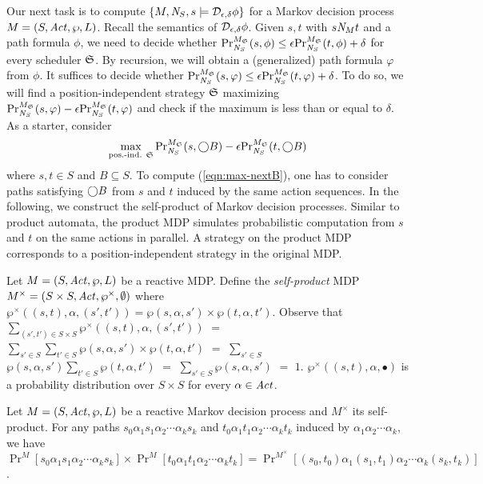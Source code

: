 Our next task is to compute $\{ M, \neighbor{S}, s \models
\dpriv{\epsilon}{\delta} \phi \}$ for a Markov decision process $M =
(S, \Act, \wp, L)$. Recall the semantics of $\dpriv{\epsilon}{\delta}
\phi$. Given $s, t$ with $s \neighbor{M} t$ and a path formula
$\phi$, we need to decide whether
$\myPr{s}{M_{\scheduler{S}}}{\neighbor{S}}{\phi} \leq 
\epsilon \myPr{t}{M_{\scheduler{S}}}{\neighbor{S}}{\phi} + \delta$
for every scheduler $\scheduler{S}$. 
By recursion, we will obtain a
(generalized) path formula $\varphi$ from $\phi$. It suffices to
decide whether 
$\myPr{s}{M_{\scheduler{S}}}{\neighbor{S}}{\varphi} \leq 
\epsilon \myPr{t}{M_{\scheduler{S}}}{\neighbor{S}}{\varphi} + \delta$.
To do so, we will find a position-independent strategy $\scheduler{S}$
maximizing $\myPr{s}{M_{\scheduler{S}}}{\neighbor{S}}{\varphi} -
\epsilon \myPr{t}{M_{\scheduler{S}}}{\neighbor{S}}{\varphi}$ and check
if the maximum is less than or equal to $\delta$. 
As a starter, consider
\begin{eqnarray}
  \label{eqn:max-nextB}
\max_{\textmd{pos.-ind. } \scheduler{S}} 
\myPr{s}{M_{\scheduler{S}}}{\neighbor{S}}{\gX B} -
\epsilon \myPr{t}{M_{\scheduler{S}}}{\neighbor{S}}{\gX B}
\end{eqnarray}
where $s, t \in S$ and $B \subseteq S$. To compute
(\ref{eqn:max-nextB}), one has to consider paths satisfying $\gX B$ 
from $s$ and $t$ induced by the same action sequences. In the
following, we construct the self-product of Markov decision
processes. Similar to product automata, the product MDP simulates
probabilistic computation from $s$ and $t$ on the same actions in
parallel. A strategy on the product MDP corresponds to a
position-independent strategy in the original MDP. 

Let $M = (S, \Act, \wp, L)$ be a reactive MDP.
Define the \emph{self-product} MDP
$M^{\times} = (S \times S, \Act, \wp^{\times}, \emptyset)$ where
$\wp^{\times} ((s, t), \alpha, (s', t')) = \wp (s, \alpha, s') \times
\wp (t, \alpha, 
t')$. Observe that $\sum_{(s', t') \in S \times S} \wp^{\times} ((s, t),
\alpha, (s', t'))$ $=$ $\sum_{s' \in S} \sum_{t' \in S} \wp (s, \alpha,
s') \times \wp (t, \alpha, t')$ $=$ $\sum_{s' \in S}$ $\wp (s, \alpha, s')
\sum_{t' \in S} \wp (t, \alpha, t')$ $=$ $\sum_{s' \in S} \wp (s, \alpha,
s')$ $=$ $1$. $\wp^{\times} ((s, t), \alpha, \bullet)$ is a probability
distribution over $S \times S$ for every $\alpha \in \Act$.

\begin{lemma}
  Let $M = (S, \Act, \wp, L)$ be a reactive Markov decision process and
  $M^{\times}$ its self-product. For any paths $s_0\alpha_1s_1\alpha_2
  \cdots \alpha_k s_k$ and $t_0 \alpha_1 t_1 \alpha_2 \cdots \alpha_k
  t_k$ induced by $\alpha_1 \alpha_2 \cdots \alpha_k$, we have
  $\Pr^{M} [s_0 \alpha_1 s_1 \alpha_2 \cdots \alpha_k s_k] \times
  \Pr^{M} [t_0 \alpha_1 t_1 \alpha_2 \cdots \alpha_k t_k] =
  \Pr^{M^{\times}} [(s_0, t_0) \alpha_1 (s_1, t_1) \alpha_2 \cdots
  \alpha_k (s_k, t_k)]$.
  \label{lemma:joint-probability}
\end{lemma}


